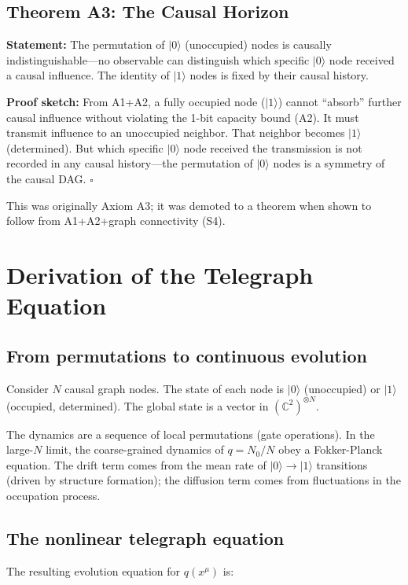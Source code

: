 \documentclass[12pt,a4paper]{article}
\begin{document}
\subsection{Theorem A3: The Causal Horizon}

{\bf Statement:} The permutation of $|0\rangle$ (unoccupied) nodes is causally indistinguishable---no observable can distinguish which specific $|0\rangle$ node received a causal influence. The identity of $|1\rangle$ nodes is fixed by their causal history.

{\bf Proof sketch:} From A1+A2, a fully occupied node ($|1\rangle$) cannot ``absorb'' further causal influence without violating the 1-bit capacity bound (A2). It must transmit influence to an unoccupied neighbor. That neighbor becomes $|1\rangle$ (determined). But which specific $|0\rangle$ node received the transmission is not recorded in any causal history---the permutation of $|0\rangle$ nodes is a symmetry of the causal DAG. $\square$

This was originally Axiom A3; it was demoted to a theorem when shown to follow from A1+A2+graph connectivity (S4).

\section{Derivation of the Telegraph Equation}

\subsection{From permutations to continuous evolution}

Consider $N$ causal graph nodes. The state of each node is $|0\rangle$ (unoccupied) or $|1\rangle$ (occupied, determined). The global state is a vector in $(\mathbb{C}^2)^{\otimes N}$.

The dynamics are a sequence of local permutations (gate operations). In the large-$N$ limit, the coarse-grained dynamics of $q=N_0/N$ obey a Fokker-Planck equation. The drift term comes from the mean rate of $|0\rangle\to|1\rangle$ transitions (driven by structure formation); the diffusion term comes from fluctuations in the occupation process.

\subsection{The nonlinear telegraph equation}

The resulting evolution equation for $q(x^\mu)$ is:
\end{document}
